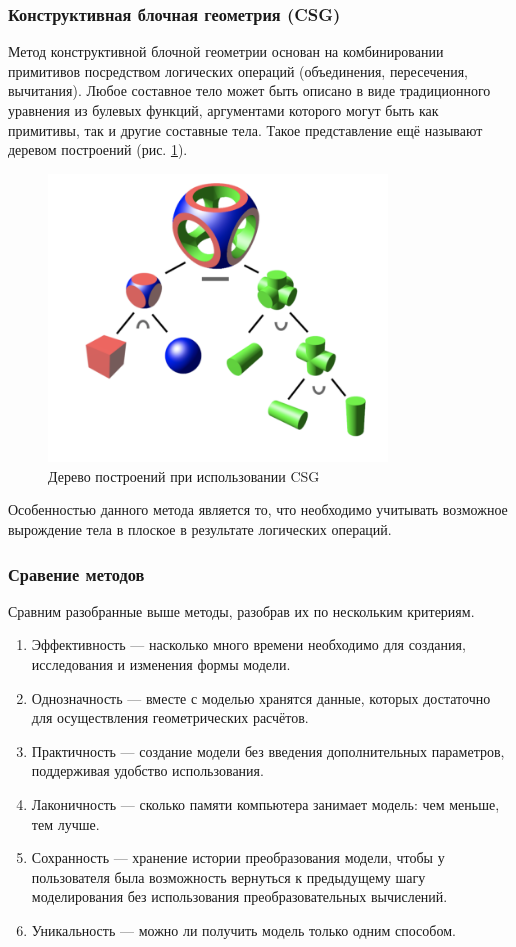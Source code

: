\subsubsection{Конструктивная блочная геометрия (CSG)}

Метод конструктивной блочной геометрии \cite{csg} основан на комбинировании 
примитивов посредством логических операций (объединения, пересечения, 
вычитания).
Любое составное тело может быть описано в виде традиционного 
уравнения из булевых функций, аргументами которого могут быть как 
примитивы, так и другие составные тела. 
Такое представление ещё называют 
деревом построений (рис. \ref{fig:csg}).

\begin{figure}[h]
	\centering
	\captionsetup{justification=centering}
	\includegraphics[width=90mm]{img/csg.png}
	\caption{Дерево построений при использовании CSG}
	\label{fig:csg}
\end{figure}


Особенностью данного метода является то, что необходимо учитывать 
возможное вырождение тела в плоское в результате логических операций.


\subsubsection{Сравение методов}

Сравним разобранные выше методы, разобрав их по нескольким 
критериям.
\begin{enumerate}[leftmargin=1.6\parindent,label=\arabic*.]
	\item Эффективность --- насколько много времени необходимо для создания, 
	исследования и изменения формы модели.
	\item Однозначность --- вместе с моделью хранятся данные, которых 
	достаточно для осуществления геометрических расчётов.
	\item Практичность --- создание модели без введения дополнительных 
	параметров, поддерживая удобство использования.
	\item Лаконичность --- сколько памяти компьютера занимает модель: чем 
	меньше, тем лучше.
	\item Сохранность --- хранение истории преобразования модели, чтобы у 
	пользователя была возможность вернуться к предыдущему шагу 
	моделирования без использования преобразовательных вычислений.
	\item Уникальность --- можно ли получить модель только одним способом.
\end{enumerate}

